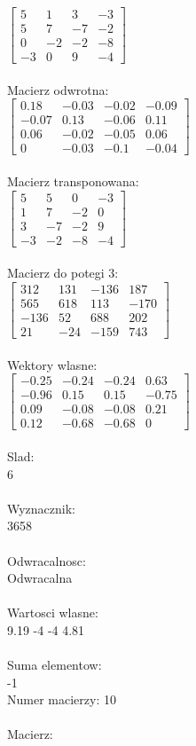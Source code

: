 \documentclass[a4paper,12pt]{article}
\begin{document}
$\begin{bmatrix} 5&1&3&-3\\5&7&-7&-2\\0&-2&-2&-8\\-3&0&9&-4 \end{bmatrix}$
\\
\\
Macierz odwrotna:\\

$\begin{bmatrix} 0.18&-0.03&-0.02&-0.09\\-0.07&0.13&-0.06&0.11\\0.06&-0.02&-0.05&0.06\\0&-0.03&-0.1&-0.04 \end{bmatrix}$
\\
\\
Macierz transponowana:\\

$\begin{bmatrix} 5&5&0&-3\\1&7&-2&0\\3&-7&-2&9\\-3&-2&-8&-4 \end{bmatrix}$
\\
\\
Macierz do potegi 3:\\

$\begin{bmatrix} 312&131&-136&187\\565&618&113&-170\\-136&52&688&202\\21&-24&-159&743 \end{bmatrix}$
\\
\\
Wektory wlasne:\\

$\begin{bmatrix} -0.25&-0.24&-0.24&0.63\\-0.96&0.15&0.15&-0.75\\0.09&-0.08&-0.08&0.21\\0.12&-0.68&-0.68&0 \end{bmatrix}$
\\
\\
Slad:\\
6
\\
\\
Wyznacznik:\\
3658
\\
\\
Odwracalnosc:\\
Odwracalna
\\
\\
Wartosci wlasne:\\
9.19 -4 -4 4.81
\\
\\
Suma elementow:\\
-1
\\
\newpage
Numer macierzy:
10
\\
\\
Macierz:\\
\end{document}
